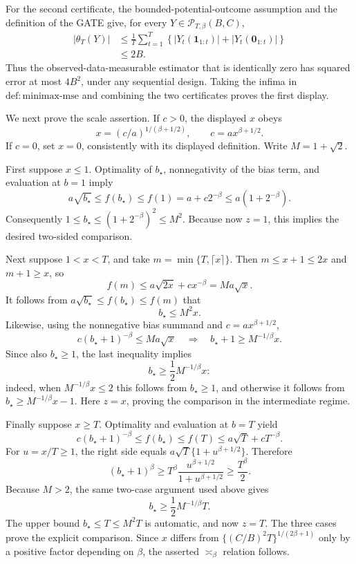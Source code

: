 For the second certificate, the bounded-potential-outcome assumption and the definition of the GATE give, for every \(Y\in\mathcal P_{T,\beta}(B,C)\),
\[
 \begin{aligned}
 |\theta_T(Y)|
 &\le \frac1T\sum_{t=1}^T
 \left\{|Y_t(\mathbf1_{1:t})|+|Y_t(\mathbf0_{1:t})|\right\}\\
 &\le 2B.
 \end{aligned}
\]
Thus the observed-data-measurable estimator that is identically zero has squared error at most \(4B^2\), under any sequential design.  Taking the infima in \(\mathrm{def{:}minimax\mbox{-}mse}\) and combining the two certificates proves the first display.

We next prove the scale assertion.  If \(c>0\), the displayed \(x\) obeys
\[
 x=(c/a)^{1/(\beta+1/2)},
 \qquad c=a x^{\beta+1/2}.
\]
If \(c=0\), set \(x=0\), consistently with its displayed definition.  Write \(M=1+\sqrt2\).

First suppose \(x\le1\).  Optimality of \(b_\star\), nonnegativity of the bias term, and evaluation at \(b=1\) imply
\[
 a\sqrt{b_\star}\le f(b_\star)\le f(1)
 =a+c2^{-\beta}\le a(1+2^{-\beta}).
\]
Consequently \(1\le b_\star\le(1+2^{-\beta})^2\le M^2\).  Because now \(z=1\), this implies the desired two-sided comparison.

Next suppose \(1<x<T\), and take \(m=\min\{T,\lceil x\rceil\}\).  Then \(m\le x+1\le2x\) and \(m+1\ge x\), so
\[
 f(m)
 \le a\sqrt{2x}+cx^{-\beta}
 =M a\sqrt x.
\]
It follows from \(a\sqrt{b_\star}\le f(b_\star)\le f(m)\) that
\[
 b_\star\le M^2x.
\]
Likewise, using the nonnegative bias summand and \(c=ax^{\beta+1/2}\),
\[
 c(b_\star+1)^{-\beta}\le M a\sqrt x
 \quad\Longrightarrow\quad
 b_\star+1\ge M^{-1/\beta}x.
\]
Since also \(b_\star\ge1\), the last inequality implies
\[
 b_\star\ge\frac12M^{-1/\beta}x:
\]
indeed, when \(M^{-1/\beta}x\le2\) this follows from \(b_\star\ge1\), and otherwise it follows from \(b_\star\ge M^{-1/\beta}x-1\).  Here \(z=x\), proving the comparison in the intermediate regime.

Finally suppose \(x\ge T\).  Optimality and evaluation at \(b=T\) yield
\[
 c(b_\star+1)^{-\beta}
 \le f(b_\star)\le f(T)
 \le a\sqrt T+cT^{-\beta}.
\]
For \(u=x/T\ge1\), the right side equals \(a\sqrt T\{1+u^{\beta+1/2}\}\).  Therefore
\[
 (b_\star+1)^\beta
 \ge T^\beta\frac{u^{\beta+1/2}}{1+u^{\beta+1/2}}
 \ge\frac{T^\beta}{2}.
\]
Because \(M>2\), the same two-case argument used above gives
\[
 b_\star\ge\frac12M^{-1/\beta}T.
\]
The upper bound \(b_\star\le T\le M^2T\) is automatic, and now \(z=T\).  The three cases prove the explicit comparison.  Since \(x\) differs from \(\{(C/B)^2T\}^{1/(2\beta+1)}\) only by a positive factor depending on \(\beta\), the asserted \(\asymp_\beta\) relation follows.

